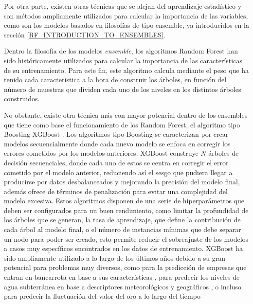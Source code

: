 \documentclass{uathesis-es}
\begin{document}

Por otra parte, existen otras técnicas que se alejan del aprendizaje estadístico y son métodos ampliamente utilizados para calcular la importancia de las variables, como son los modelos basados en filosofías de tipo ensemble, ya introducidos en la sección \ref{RF_INTRODUCTION_TO_ENSEMBLES}.

Dentro la filosofía de los modelos \textit{ensemble}, los algoritmos Random Forest han sido históricamente utilizados para calcular la importancia de las características de su entrenamiento. Para este fin, este algoritmo calcula mediante el peso que ha tenido cada característica a la hora de construir los árboles, en función del número de muestras que dividen cada uno de los niveles en los distintos árboles construidos.

No obstante, existe otra técnica más con mayor potencial dentro de los ensembles que tiene como base el funcionamiento de los Random Forest, el algoritmo tipo Boosting XGBoost \cite{Chen_2016}. Los algoritmos tipo Boosting se caracterizan por crear modelos secuencialmente donde cada nuevo modelo se enfoca en corregir los errores cometidos por los modelos anteriores. XGBoost construye $N$ árboles de decisión secuenciales, donde cada uno de estos se centra en corregir el error cometido por el modelo anterior, reduciendo así el sesgo que pudiera llegar a producirse por datos desbalanceados y mejorando la precisión del modelo final, además ofrece de términos de penalización para evitar una complejidad del modelo excesiva. Estos algoritmos disponen de una serie de hiperparámetros que deben ser configurados para un buen rendimiento, como limitar la profundidad de los árboles que se generan, la tasa de aprendizaje, que define la contribución de cada árbol al modelo final, o el número de instancias mínimas que debe separar un nodo para poder ser creado, esto permite reducir el sobreajuste de los modelos a casos muy específicos encontrados en los datos de entrenamiento. XGBoost ha sido ampliamente utilizado a lo largo de los últimos años debido a su gran potencial para problemas muy diversos, como para la predicción de empresas que entran en bancarrota en base a sus características \cite{BenJabeur2023}, para predecir los niveles de agua subterránea en base a descriptores meteorológicos y geográficos \cite{IBRAHEMAHMEDOSMAN20211545}, o incluso para predecir la fluctuación del valor del oro a lo largo del tiempo \cite{Jabeur2021}
\end{document}
